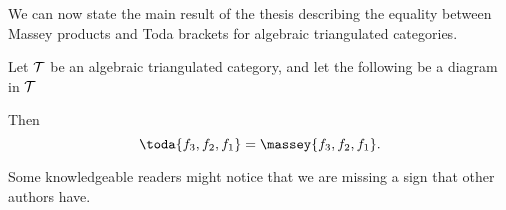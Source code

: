 We can now state the main result of the thesis describing the equality between Massey products and Toda brackets for algebraic triangulated categories.

\begin{theorem}[Massey products = Toda brackets]
    \label{theorem:massey_equals_toda}
    Let \( {\mathcal{T}} \) be an algebraic triangulated category, and let the following be a diagram in \( {\mathcal{T}} \)
    \begin{center}
    \end{center}

    Then
    \[
        \toda{f_3, f_2, f_1} = \massey{f_3, f_2, f_1}.
    \]
\end{theorem}

Some knowledgeable readers might notice that we are missing a sign that other authors have.

